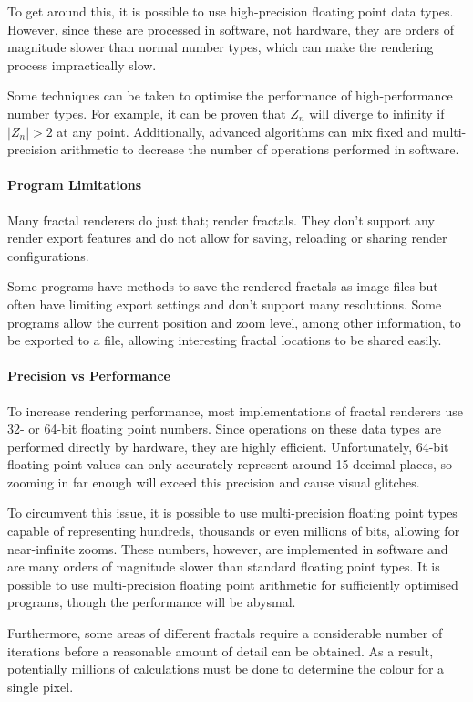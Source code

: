 To get around this, it is possible to use high-precision floating point data types. However, since these are processed in software, not hardware, they are orders of magnitude slower than normal number types, which can make the rendering process impractically slow.

Some techniques can be taken to optimise the performance of high-performance number types. For example, it can be proven that \(Z_n\) will diverge to infinity if \(|Z_n|>2\) at any point. Additionally, advanced algorithms can mix fixed and multi-precision arithmetic to decrease the number of operations performed in software.

\paragraph{Program Limitations} Many fractal renderers do just that; render fractals. They don't support any render export features and do not allow for saving, reloading or sharing render configurations. 

Some programs have methods to save the rendered fractals as image files but often have limiting export settings and don't support many resolutions. Some programs allow the current position and zoom level, among other information, to be exported to a file, allowing interesting fractal locations to be shared easily.

\paragraph{Precision vs Performance} To increase rendering performance, most implementations of fractal renderers use 32- or 64-bit floating point numbers. Since operations on these data types are performed directly by hardware, they are highly efficient. Unfortunately, 64-bit floating point values can only accurately represent around 15 decimal places, so zooming in far enough will exceed this precision and cause visual glitches.

To circumvent this issue, it is possible to use multi-precision floating point types capable of representing hundreds, thousands or even millions of bits, allowing for near-infinite zooms. These numbers, however, are implemented in software and are many orders of magnitude slower than standard floating point types. It is possible to use multi-precision floating point arithmetic for sufficiently optimised programs, though the performance will be abysmal.

Furthermore, some areas of different fractals require a considerable number of iterations before a reasonable amount of detail can be obtained. As a result, potentially millions of calculations must be done to determine the colour for a single pixel.


